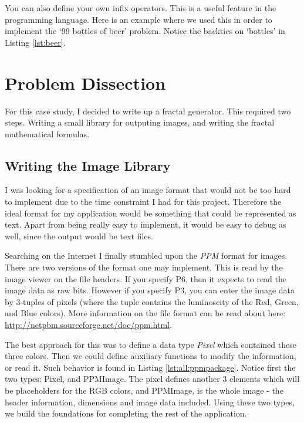 You can also define your own infix operators. This is a useful feature in the
programming language. Here is an example where we used this in order to
implement the `99 bottles of beer' problem. Notice the backtics on `bottles' in
Listing \ref{lst:beer}.


\section{Problem Dissection}

For this case study, I decided to write up a fractal generator. This required
two steps. Writing a small library for outputing images, and writing the 
fractal mathematical formulas. 

\subsection{Writing the Image Library}

I was looking for a specification of an image format that would not be too hard
to implement due to the time constraint I had for this project. Therefore the
ideal format for my application would be something that could be represented as
text. Apart from being really easy to implement, it would be easy to debug as
well, since the output would be text files. 

Searching on the Internet I finally stumbled upon the \textit{PPM} format for 
images. There are two versions of the format one may implement. This is read
by the image viewer on the file headers. If you specify P6, then it expects to
read the image data as raw bits. However if you specify P3, you can enter the
image data by 3-tuples of pixels (where the tuple contains the luminoscity of
the Red, Green, and Blue colors). More information on the file format can be
read about here: \url{http://netpbm.sourceforge.net/doc/ppm.html}.

The best approach for this was to define a data type \textit{Pixel} which 
contained these three colors. Then we could define auxiliary functions to 
modify the information, or read it. Such behavior is found in Listing
\ref{lst:all:ppmpackage}. Notice first the two types: Pixel, and PPMImage. The
pixel defines another 3 elements which will be placeholders for the RGB colors,
and PPMImage, is the whole image - the header information, dimensions and image
data included. Using these two types, we build the foundations for completing
the rest of the application.

